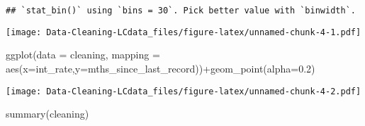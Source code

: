 \documentclass[
]{article}
\newenvironment{Shaded}{\begin{snugshade}}{\end{snugshade}}
\newcommand{\AttributeTok}[1]{\textcolor[rgb]{0.77,0.63,0.00}{#1}}
\newcommand{\FloatTok}[1]{\textcolor[rgb]{0.00,0.00,0.81}{#1}}
\newcommand{\FunctionTok}[1]{\textcolor[rgb]{0.00,0.00,0.00}{#1}}
\newcommand{\NormalTok}[1]{#1}
\newcommand{\SpecialCharTok}[1]{\textcolor[rgb]{0.00,0.00,0.00}{#1}}
\begin{document}
\begin{verbatim}
## `stat_bin()` using `bins = 30`. Pick better value with `binwidth`.
\end{verbatim}

\texttt{[image: Data-Cleaning-LCdata\_files/figure-latex/unnamed-chunk-4-1.pdf]}

\begin{Shaded}
\begin{Highlighting}[]
\FunctionTok{ggplot}\NormalTok{(}\AttributeTok{data =}\NormalTok{ cleaning, }\AttributeTok{mapping =} \FunctionTok{aes}\NormalTok{(}\AttributeTok{x=}\NormalTok{int\_rate,}\AttributeTok{y=}\NormalTok{mths\_since\_last\_record))}\SpecialCharTok{+}\FunctionTok{geom\_point}\NormalTok{(}\AttributeTok{alpha=}\FloatTok{0.2}\NormalTok{)}
\end{Highlighting}
\end{Shaded}

\texttt{[image: Data-Cleaning-LCdata\_files/figure-latex/unnamed-chunk-4-2.pdf]}

\begin{Shaded}
\begin{Highlighting}[]
\FunctionTok{summary}\NormalTok{(cleaning)}
\end{Highlighting}
\end{Shaded}
\end{document}
